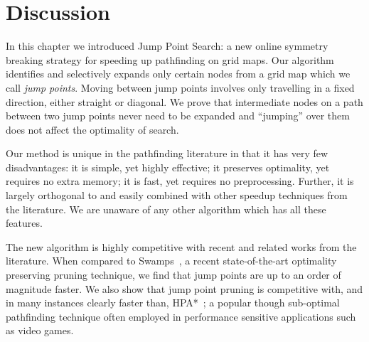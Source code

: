 \section{Discussion}
\label{cha::jps::discussion}
In this chapter we introduced Jump Point Search: a new online symmetry breaking
strategy for speeding up pathfinding on grid maps.  Our algorithm identifies
and selectively expands only certain nodes from a grid map which we call
\emph{jump points}.  Moving between jump points involves only travelling in a
fixed direction, either straight or diagonal.  We prove that intermediate nodes
on a path between two jump points never need to be expanded and ``jumping'' over
them does not affect the optimality of search. 
\par
Our method is unique in the pathfinding literature in that it has very few
disadvantages: it is simple, yet highly effective; it preserves optimality, yet
requires no extra memory;  it is fast, yet requires no preprocessing.
Further, it is largely orthogonal to and easily combined with 
other speedup techniques from the literature.
We are unaware of any other algorithm which has all these features.
\par
The new algorithm is highly competitive with recent and related works from the
literature.  When compared to Swamps~\citep{pochter10}, a recent
state-of-the-art optimality preserving pruning technique, we find that jump
points are up to an order of magnitude faster.  We also show that jump point
pruning is competitive with, and in many instances clearly faster than,
HPA*~\citep{botea04}; a popular though sub-optimal pathfinding technique often
employed in performance sensitive applications such as video games.
